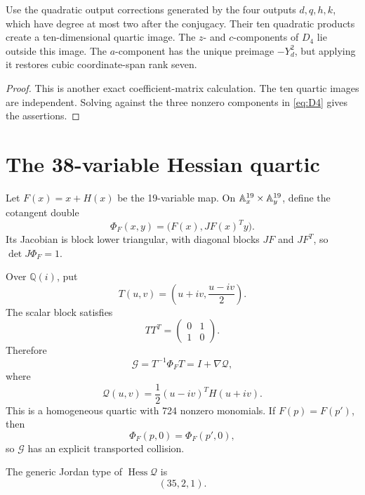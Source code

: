 \documentclass[11pt,reqno]{amsart}
\begin{document}
\begin{proposition}
\label{prop:target-cleanup}
Use the quadratic output corrections generated by the four outputs
\(d,q,h,k\), which have degree at most two after the conjugacy.  Their ten
quadratic products create a ten-dimensional quartic image.
The \(z\)- and \(c\)-components of \(D_4\) lie outside this image.  The
\(a\)-component has the unique preimage \(-Y_d^2\), but applying it restores
cubic coordinate-span rank seven.
\end{proposition}

\begin{proof}
This is another exact coefficient-matrix calculation.  The ten quartic
images are independent.  Solving against the three nonzero components in
\eqref{eq:D4} gives the assertions.
\end{proof}

\section{The 38-variable Hessian quartic}
\label{sec:hessian}

Let \(F(x)=x+H(x)\) be the 19-variable map.  On
\(\mathbb A^{19}_x\times\mathbb A^{19}_y\), define the cotangent double
\[
\Phi_F(x,y)=\bigl(F(x),JF(x)^Ty\bigr).
\]
Its Jacobian is block lower triangular, with diagonal blocks \(JF\) and
\(JF^T\), so \(\det J\Phi_F=1\).

Over \(\mathbb Q(i)\), put
\[
T(u,v)=\left(u+iv,\frac{u-iv}{2}\right).
\]
The scalar block satisfies
\[
TT^T=
\begin{pmatrix}0&1\\1&0\end{pmatrix}.
\]
Therefore
\[
\mathcal G=T^{-1}\Phi_FT=I+\nabla\mathcal Q,
\]
where
\begin{equation}
\label{eq:Q38}
\mathcal Q(u,v)=\frac12(u-iv)^TH(u+iv).
\end{equation}
This is a homogeneous quartic with 724 nonzero monomials.  If
\(F(p)=F(p')\), then
\[
\Phi_F(p,0)=\Phi_F(p',0),
\]
so \(\mathcal G\) has an explicit transported collision.

\begin{proposition}
\label{prop:hessian-jordan}
The generic Jordan type of \(\operatorname{Hess}\mathcal Q\) is
\[
(35,2,1).
\]
\end{proposition}
\end{document}
